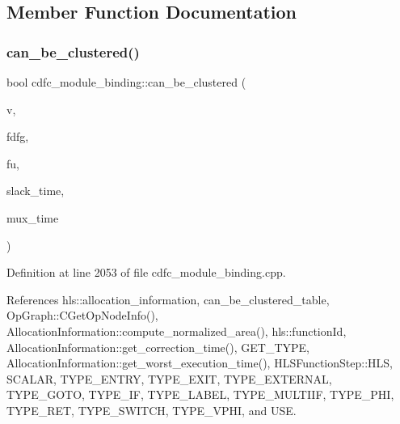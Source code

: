 \subsection{Member Function Documentation}
\mbox{\label{classcdfc__module__binding_a2986ac32a8bb871de7f5f06cd3cfc4da}} 
\subsubsection{\texorpdfstring{can\+\_\+be\+\_\+clustered()}{can\_be\_clustered()}}
{\footnotesize\ttfamily bool cdfc\+\_\+module\+\_\+binding\+::can\+\_\+be\+\_\+clustered (\begin{DoxyParamCaption}\item[{\hyperlink{graph_8hpp_abefdcf0544e601805af44eca032cca14}{vertex}}]{v,  }\item[{\hyperlink{op__graph_8hpp_a9a0b240622c47584bee6951a6f5de746}{Op\+Graph\+Const\+Ref}}]{fdfg,  }\item[{const \hyperlink{fu__binding_8hpp_a61ca2120cd9d7839a550557a05fa776d}{fu\+\_\+binding\+Const\+Ref}}]{fu,  }\item[{const \hyperlink{custom__map_8hpp_ad1ed68f2ff093683ab1a33522b144adc}{Custom\+Unordered\+Map}$<$ \hyperlink{graph_8hpp_abefdcf0544e601805af44eca032cca14}{vertex}, double $>$ \&}]{slack\+\_\+time,  }\item[{const double}]{mux\+\_\+time }\end{DoxyParamCaption})\hspace{0.3cm}{\ttfamily [protected]}}



Definition at line 2053 of file cdfc\+\_\+module\+\_\+binding.\+cpp.



References hls\+::allocation\+\_\+information, can\+\_\+be\+\_\+clustered\+\_\+table, Op\+Graph\+::\+C\+Get\+Op\+Node\+Info(), Allocation\+Information\+::compute\+\_\+normalized\+\_\+area(), hls\+::function\+Id, Allocation\+Information\+::get\+\_\+correction\+\_\+time(), G\+E\+T\+\_\+\+T\+Y\+PE, Allocation\+Information\+::get\+\_\+worst\+\_\+execution\+\_\+time(), H\+L\+S\+Function\+Step\+::\+H\+LS, S\+C\+A\+L\+AR, T\+Y\+P\+E\+\_\+\+E\+N\+T\+RY, T\+Y\+P\+E\+\_\+\+E\+X\+IT, T\+Y\+P\+E\+\_\+\+E\+X\+T\+E\+R\+N\+AL, T\+Y\+P\+E\+\_\+\+G\+O\+TO, T\+Y\+P\+E\+\_\+\+IF, T\+Y\+P\+E\+\_\+\+L\+A\+B\+EL, T\+Y\+P\+E\+\_\+\+M\+U\+L\+T\+I\+IF, T\+Y\+P\+E\+\_\+\+P\+HI, T\+Y\+P\+E\+\_\+\+R\+ET, T\+Y\+P\+E\+\_\+\+S\+W\+I\+T\+CH, T\+Y\+P\+E\+\_\+\+V\+P\+HI, and U\+SE.




